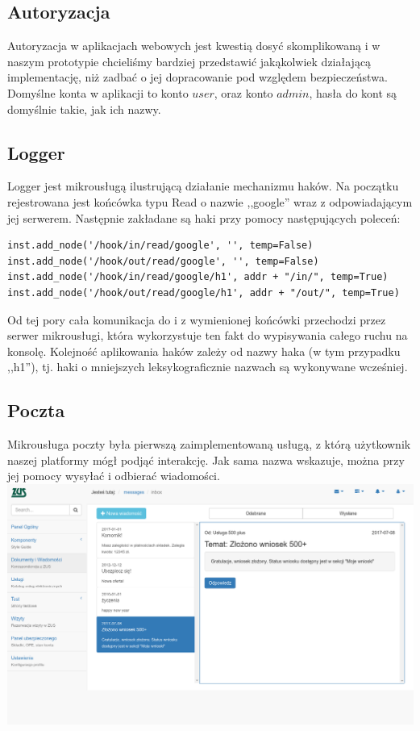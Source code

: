 \documentclass[licencjacka]{pracamgr}
\begin{document}
\subsection{Autoryzacja}
Autoryzacja w aplikacjach webowych jest kwestią dosyć skomplikowaną i w naszym prototypie chcieliśmy bardziej przedstawić jakąkolwiek działającą implementację, niż zadbać o jej dopracowanie pod względem bezpieczeństwa.
Domyślne konta w aplikacji to konto $user$, oraz konto $admin$, hasła do kont są domyślnie takie, jak ich nazwy.

\subsection{Logger}

Logger jest mikrousługą ilustrującą działanie mechanizmu haków. Na początku
rejestrowana jest końcówka typu Read o nazwie ,,google'' wraz z odpowiadającym
jej serwerem. Następnie zakładane są haki przy pomocy następujących poleceń:
\begin{verbatim}
inst.add_node('/hook/in/read/google', '', temp=False)
inst.add_node('/hook/out/read/google', '', temp=False)
inst.add_node('/hook/in/read/google/h1', addr + "/in/", temp=True)
inst.add_node('/hook/out/read/google/h1', addr + "/out/", temp=True)
\end{verbatim}
Od tej pory cała komunikacja do i z wymienionej końcówki przechodzi przez serwer
mikrousługi, która wykorzystuje ten fakt do wypisywania całego ruchu na konsolę.
Kolejność aplikowania haków zależy od nazwy haka (w tym przypadku ,,h1''), tj.
haki o mniejszych leksykograficznie nazwach są wykonywane wcześniej.

\subsection{Poczta}
Mikrousługa poczty była pierwszą zaimplementowaną usługą, z którą użytkownik
naszej platformy mógł podjąć interakcję. Jak sama nazwa wskazuje, można przy jej
pomocy wysyłać i odbierać wiadomości.\\
\includegraphics[width=\textwidth]{obrazki/poczta.png}
\end{document}
